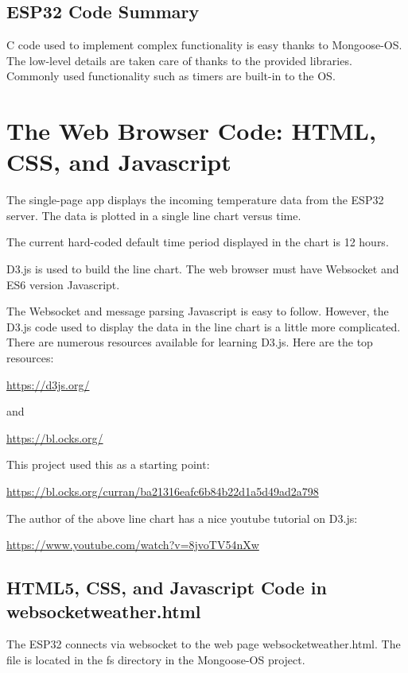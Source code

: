 \documentclass[letterpaper,]{book}
\begin{document}
\section{ESP32 Code Summary}\label{esp32-code-summary}

C code used to implement complex functionality is easy thanks to
Mongoose-OS. The low-level details are taken care of thanks to the
provided libraries. Commonly used functionality such as timers are
built-in to the OS.

\chapter{The Web Browser Code: HTML, CSS, and
Javascript}\label{the-web-browser-code-html-css-and-javascript}

The single-page app displays the incoming temperature data from the
ESP32 server. The data is plotted in a single line chart versus time.

The current hard-coded default time period displayed in the chart is 12
hours.

D3.js is used to build the line chart. The web browser must have
Websocket and ES6 version Javascript.

The Websocket and message parsing Javascript is easy to follow. However,
the D3.js code used to display the data in the line chart is a little
more complicated. There are numerous resources available for learning
D3.js. Here are the top resources:

\url{https://d3js.org/}

and

\url{https://bl.ocks.org/}

This project used this as a starting point:

\url{https://bl.ocks.org/curran/ba21316eafc6b84b22d1a5d49ad2a798}

The author of the above line chart has a nice youtube tutorial on D3.js:

\url{https://www.youtube.com/watch?v=8jvoTV54nXw}

\section{HTML5, CSS, and Javascript Code in
websocketweather.html}\label{html5-css-and-javascript-code-in-websocketweather.html}

The ESP32 connects via websocket to the web page websocketweather.html.
The file is located in the fs directory in the Mongoose-OS project.
\end{document}
